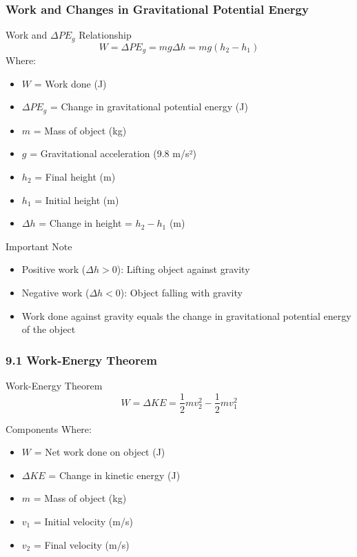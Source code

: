 \documentclass{beamer}
\begin{document}
\begin{frame}
\frametitle{Work and Changes in Gravitational Potential Energy}
\begin{block}{Work and $\Delta PE_g$ Relationship}
$$W = \Delta PE_g = mg\Delta h = mg(h_2 - h_1)$$
Where:
\begin{itemize}
\item $W$ = Work done (J)
\item $\Delta PE_g$ = Change in gravitational potential energy (J)
\item $m$ = Mass of object (kg)
\item $g$ = Gravitational acceleration (9.8 m/s²)
\item $h_2$ = Final height (m)
\item $h_1$ = Initial height (m)
\item $\Delta h$ = Change in height = $h_2 - h_1$ (m)
\end{itemize}
\end{block}
\end{frame}

\begin{frame}
\begin{alertblock}{Important Note}
\begin{itemize}
\item Positive work ($\Delta h > 0$): Lifting object against gravity
\item Negative work ($\Delta h < 0$): Object falling with gravity
\item Work done against gravity equals the change in gravitational potential energy of the object
\end{itemize}
\end{alertblock}
\end{frame}

\begin{frame}
\frametitle{9.1 Work-Energy Theorem}
\begin{block}{Work-Energy Theorem}
$$W = \Delta KE = \frac{1}{2}mv_2^2 - \frac{1}{2}mv_1^2$$
\end{block}

\begin{block}{Components}
Where:
\begin{itemize}
\item $W$ = Net work done on object (J)
\item $\Delta KE$ = Change in kinetic energy (J)
\item $m$ = Mass of object (kg)
\item $v_1$ = Initial velocity (m/s)
\item $v_2$ = Final velocity (m/s)
\end{itemize}
\end{block}
\end{frame}
\end{document}
